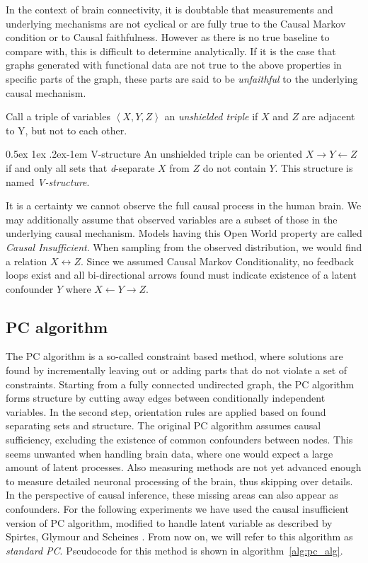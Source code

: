 \documentclass[a4paper, 10pt, english, onecolumn]{article}
\makeatletter
\renewcommand{\paragraph}{%
  \@startsection{paragraph}{4}%
  {\z@}{0.5ex \@plus 1ex \@minus .2ex}{-1em}%
  {\normalfont\normalsize\bfseries}%
}
\makeatother
\begin{document}
In the context of brain connectivity, it is doubtable that measurements and underlying mechanisms are not cyclical or are fully true to the Causal Markov condition or to Causal faithfulness.
However as there is no true baseline to compare with, this is difficult to determine analytically.
If it is the case that graphs generated with functional data are not true to the above properties in specific parts of the graph, these parts are said to be \textit{unfaithful} to the underlying causal mechanism.

Call a triple of variables $\left < X,Y,Z \right >$ an \textit{unshielded triple} if $X$ and $Z$ are adjacent to Y, but not to each other.

\paragraph{V-structure}
An unshielded triple can be oriented $X \rightarrow Y \leftarrow Z$ if and only all sets that \textit{d}-separate $X$ from $Z$ do not contain $Y$.
This structure is named \textit{V-structure}.

It is a certainty we cannot observe the full causal process in the human brain.
We may additionally assume that observed variables are a subset of those in the underlying causal mechanism.
Models having this Open World property are called \textit{Causal Insufficient}.
When sampling from the observed distribution, we would find a relation $X \leftrightarrow Z$.
Since we assumed Causal Markov Conditionality, no feedback loops exist and all bi-directional arrows found must indicate existence of a latent confounder $Y$ where $X \leftarrow Y \rightarrow Z$.

\subsection{PC algorithm}
The PC algorithm is a so-called constraint based method, where solutions are found by incrementally leaving out or adding parts that do not violate a set of constraints.
Starting from a fully connected undirected graph, the PC algorithm forms structure by cutting away edges between conditionally independent variables.
In the second step, orientation rules are applied based on found separating sets and structure.
The original PC algorithm assumes causal sufficiency, excluding the existence of common confounders between nodes.
This seems unwanted when handling brain data, where one would expect a large amount of latent processes.
Also measuring methods are not yet advanced enough to measure detailed neuronal processing of the brain, thus skipping over details.
In the perspective of causal inference, these missing areas can also appear as confounders.
For the following experiments we have used the causal insufficient version of PC algorithm, modified to handle latent variable as described by Spirtes, Glymour and Scheines \cite[p.165-167]{spirtes2000}.
From now on, we will refer to this algorithm as \textit{standard PC}.
Pseudocode for this method is shown in algorithm~\ref{alg:pc_alg}.
\end{document}
